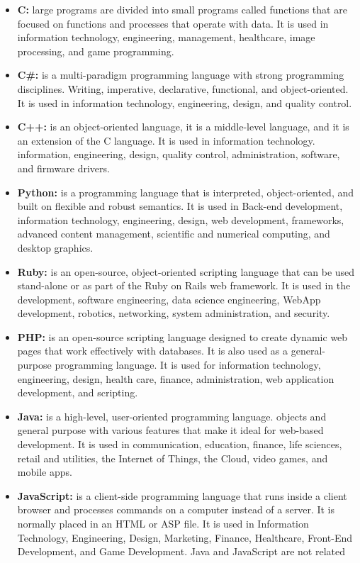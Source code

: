 \documentclass[11pt, letterpaper, english]{article}
\begin{document}
      \begin{itemize} 
      \item{ \textbf{C:} large programs are divided into small programs called functions that are focused on functions and processes that operate with data. It is used in information technology, engineering, management, healthcare, image processing, and game programming.} 
      \item{\textbf{C\#:} is a multi-paradigm programming language with strong programming disciplines. Writing, imperative, declarative, functional, and object-oriented. It is used in information technology, engineering, design, and quality control.} 
      \item{\textbf{C++:} is an object-oriented language, it is a middle-level language, and it is an extension of the C language. It is used in information technology. information, engineering, design, quality control, administration, software, and firmware drivers. } 
      \item{\textbf{Python:} is a programming language that is interpreted, object-oriented, and built on flexible and robust semantics. It is used in Back-end development, information technology, engineering, design, web development, frameworks, advanced content management, scientific and numerical computing, and desktop graphics.} 
      \item{\textbf{Ruby:} is an open-source, object-oriented scripting language that can be used stand-alone or as part of the Ruby on Rails web framework. It is used in the development, software engineering, data science engineering, WebApp development, robotics, networking, system administration, and security.} 
      \item{\textbf{PHP:}  is an open-source scripting language designed to create dynamic web pages that work effectively with databases. It is also used as a general-purpose programming language. It is used for information technology, engineering, design, health care, finance, administration, web application development, and scripting.} 
      \item{\textbf{Java:} is a high-level, user-oriented programming language. objects and general purpose with various features that make it ideal for web-based development. It is used in communication, education, finance, life sciences, retail and utilities, the Internet of Things, the Cloud, video games, and mobile apps.}
      \item{\textbf{JavaScript:} is a client-side programming language that runs inside a client browser and processes commands on a computer instead of a server. It is normally placed in an HTML or ASP file. It is used in Information Technology, Engineering, Design, Marketing, Finance, Healthcare, Front-End Development, and Game Development. Java and JavaScript are not related} 
      \end{itemize} 
\end{document}
